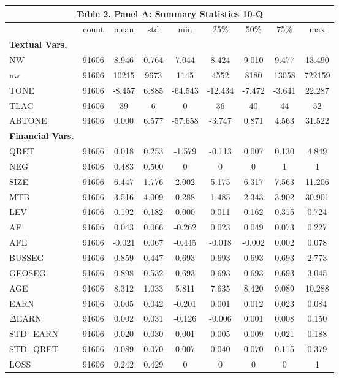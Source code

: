 \begin{table}[htbp] \label{T2PA}
  \centering
    \begin{tabular}{lcccccccc}
    \multicolumn{9}{c}{\textbf{Table 2. Panel A: Summary Statistics 10-Q}} \\
    \midrule
      & count & mean & std & min & 25\% & 50\% & 75\% & max \\
    \midrule
    \textbf{Textual Vars.} &   &   &   &   &   &   &   &  \\
    NW & 91606 & 8.946 & 0.764 & 7.044 & 8.424 & 9.010 & 9.477 & 13.490 \\
    nw & 91606 & 10215 & 9673 & 1145 & 4552 & 8180 & 13058 & 722159 \\
    TONE & 91606 & -8.457 & 6.885 & -64.543 & -12.434 & -7.472 & -3.641 & 22.287 \\
    TLAG & 91606 & 39 & 6 & 0 & 36 & 40 & 44 & 52 \\
    ABTONE & 91606 & 0.000 & 6.577 & -57.658 & -3.747 & 0.871 & 4.563 & 31.522 \\
    \textbf{Financial Vars.} &   &   &   &   &   &   &   &  \\
    QRET & 91606 & 0.018 & 0.253 & -1.579 & -0.113 & 0.007 & 0.130 & 4.849 \\
    NEG & 91606 & 0.483 & 0.500 & 0 & 0 & 0 & 1 & 1 \\
    SIZE & 91606 & 6.447 & 1.776 & 2.002 & 5.175 & 6.317 & 7.563 & 11.206 \\
    MTB & 91606 & 3.516 & 4.009 & 0.288 & 1.485 & 2.343 & 3.902 & 30.901 \\
    LEV & 91606 & 0.192 & 0.182 & 0.000 & 0.011 & 0.162 & 0.315 & 0.724 \\
    AF & 91606 & 0.043 & 0.066 & -0.262 & 0.023 & 0.049 & 0.073 & 0.227 \\
    AFE & 91606 & -0.021 & 0.067 & -0.445 & -0.018 & -0.002 & 0.002 & 0.078 \\
    BUSSEG & 91606 & 0.859 & 0.447 & 0.693 & 0.693 & 0.693 & 0.693 & 2.773 \\
    GEOSEG & 91606 & 0.898 & 0.532 & 0.693 & 0.693 & 0.693 & 0.693 & 3.045 \\
    AGE & 91606 & 8.312 & 1.033 & 5.811 & 7.635 & 8.420 & 9.089 & 10.288 \\
    EARN & 91606 & 0.005 & 0.042 & -0.201 & 0.001 & 0.012 & 0.023 & 0.084 \\
    $\Delta$EARN & 91606 & 0.002 & 0.031 & -0.126 & -0.006 & 0.001 & 0.008 & 0.150 \\
    STD\_EARN & 91606 & 0.020 & 0.030 & 0.001 & 0.005 & 0.009 & 0.021 & 0.188 \\
    STD\_QRET & 91606 & 0.089 & 0.070 & 0.007 & 0.040 & 0.070 & 0.115 & 0.379 \\
    LOSS & 91606 & 0.242 & 0.429 & 0 & 0 & 0 & 0 & 1 \\
    \bottomrule
    \end{tabular}%
\end{table}%
